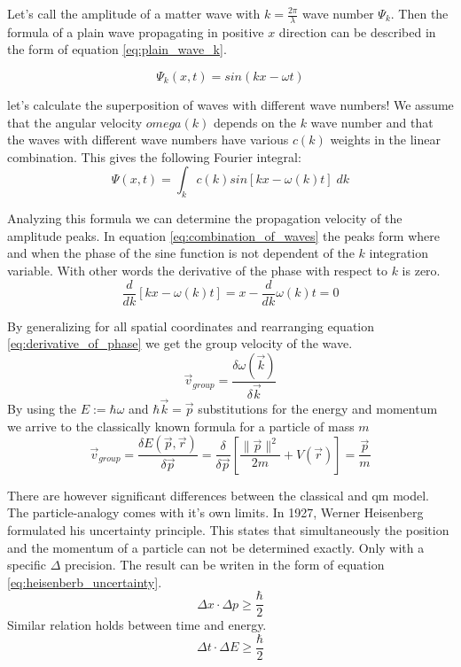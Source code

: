 Let's call the amplitude of a matter wave with $k=\frac{2\pi}{\lambda}$ wave number $\Psi_k$. Then the formula of a plain wave propagating in positive $x$ direction can be described in the form of equation \ref{eq:plain_wave_k}.

\begin{equation}
	\label{eq:plain_wave_k}
	\Psi_k(x, t) = sin(kx - \omega t)
\end{equation}

let's calculate the superposition of waves with different wave numbers! We assume that the angular velocity $omega(k)$ depends on the $k$ wave number and that the waves with different wave numbers have various $c(k)$ weights in the linear combination. This gives the following Fourier integral:
\begin{equation}
	\label{eq:combination_of_waves}
	\Psi(x, t) = \int_k c(k) sin[kx - \omega(k)t]\; dk
\end{equation}

Analyzing this formula we can determine the propagation velocity of the amplitude peaks.
In equation \ref{eq:combination_of_waves} the peaks form where and when the phase of the sine function is not dependent of the $k$ integration variable. With other words the derivative of the phase with respect to $k$ is zero.
\begin{equation}
	\label{eq:derivative_of_phase}
	\frac{d}{dk}[kx - \omega(k)t] = x - \frac{d}{dk}\omega(k)t = 0
\end{equation}

By generalizing for all spatial coordinates and rearranging equation \ref{eq:derivative_of_phase} we get the group velocity of the wave.
\begin{equation}
	\label{eq:group_velocity}
	\vec{v}_{group} = \frac{\delta \omega(\vec{k})}{\delta \vec{k}}
\end{equation}
By using the $E := \hbar \omega$ and $\hbar \vec{k} = \vec{p}$ substitutions for the energy and momentum we arrive to the classically known formula for a particle of mass $m$
\begin{equation}
	\label{eq:classical_group_velocity}
	\vec{v}_{group} = \frac{\delta E(\vec{p}, \vec{r})}{\delta\vec{p}} = \frac{\delta}{\delta\vec{p}}\left[ \frac{\|\vec{p}\|^2}{2m} + V(\vec{r}) \right] = \frac{\vec{p}}{m}
\end{equation}

There are however significant differences between the classical and \acrshort{qm} model.
The particle-analogy comes with it's own limits.
In 1927, Werner Heisenberg formulated his uncertainty principle.
This states that simultaneously the position and the momentum of a particle can not be determined exactly.
Only with a specific $\Delta$ precision.
The result can be writen in the form of equation \ref{eq:heisenberb_uncertainty}.
\begin{equation}
	\label{eq:heisenberb_uncertainty}
	\Delta x \cdot \Delta p \geq \frac{\hbar}{2}
\end{equation}
Similar relation holds between time and energy.
\begin{equation}
	\label{}
	\Delta t \cdot \Delta E \geq \frac{\hbar}{2}
\end{equation}

